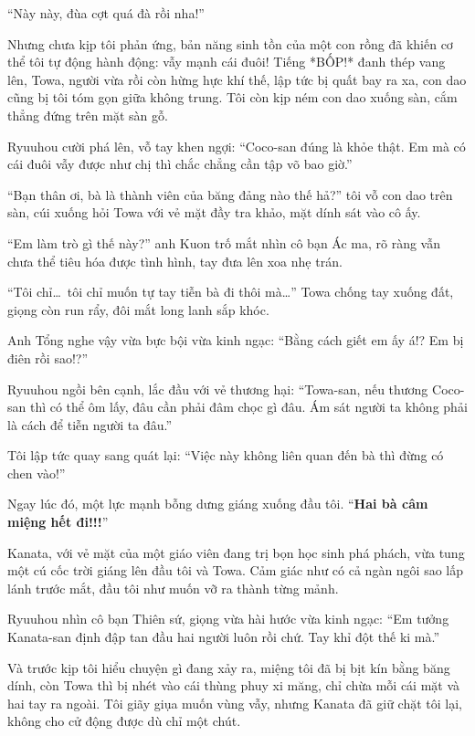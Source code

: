 \documentclass[../main.tex]{subfiles}
\begin{document}
``Này này, đùa cợt quá đà rồi nha!''

Nhưng chưa kịp tôi phản ứng, bản năng sinh tồn của một con rồng đã khiến cơ thể tôi tự động hành động: vẫy mạnh cái đuôi! Tiếng *BỐP!* đanh thép vang lên, Towa, người vừa rồi còn hừng hực khí thế, lập tức bị quất bay ra xa, con dao cũng bị tôi tóm gọn giữa không trung. Tôi còn kịp ném con dao xuống sàn, cắm thẳng đứng trên mặt sàn gỗ.

Ryuuhou cười phá lên, vỗ tay khen ngợi: ``Coco-san đúng là khỏe thật. Em mà có cái đuôi vẫy được như chị thì chắc chẳng cần tập võ bao giờ.''

``Bạn thân ơi, bà là thành viên của băng đảng nào thế hả?'' tôi vỗ con dao trên sàn, cúi xuống hỏi Towa với vẻ mặt đầy tra khảo, mặt dính sát vào cô ấy.

``Em làm trò gì thế này?'' anh Kuon trố mắt nhìn cô bạn Ác ma, rõ ràng vẫn chưa thể tiêu hóa được tình hình, tay đưa lên xoa nhẹ trán.

``Tôi chỉ\dots\ tôi chỉ muốn tự tay tiễn bà đi thôi mà\dots'' Towa chống tay xuống đất, giọng còn run rẩy, đôi mắt long lanh sắp khóc.

Anh Tổng nghe vậy vừa bực bội vừa kinh ngạc: ``Bằng cách giết em ấy á!? Em bị điên rồi sao!?''

Ryuuhou ngồi bên cạnh, lắc đầu với vẻ thương hại: ``Towa-san, nếu thương Coco-san thì có thể ôm lấy, đâu cần phải đâm chọc gì đâu. Ám sát người ta không phải là cách để tiễn người ta đâu.''

Tôi lập tức quay sang quát lại: ``Việc này không liên quan đến bà thì đừng có chen vào!''

Ngay lúc đó, một lực mạnh bỗng dưng giáng xuống đầu tôi. ``\textbf{Hai bà câm miệng hết đi!!!}''

Kanata, với vẻ mặt của một giáo viên đang trị bọn học sinh phá phách, vừa tung một cú cốc trời giáng lên đầu tôi và Towa. Cảm giác như có cả ngàn ngôi sao lấp lánh trước mắt, đầu tôi như muốn vỡ ra thành từng mảnh.

Ryuuhou nhìn cô bạn Thiên sứ, giọng vừa hài hước vừa kinh ngạc: ``Em tưởng Kanata-san định đập tan đầu hai người luôn rồi chứ. Tay khỉ đột thế ki mà.''

Và trước kịp tôi hiểu chuyện gì đang xảy ra, miệng tôi đã bị bịt kín bằng băng dính, còn Towa thì bị nhét vào cái thùng phuy xi măng, chỉ chừa mỗi cái mặt và hai tay ra ngoài. Tôi giãy giụa muốn vùng vẫy, nhưng Kanata đã giữ chặt tôi lại, không cho cử động được dù chỉ một chút.

\end{document}
